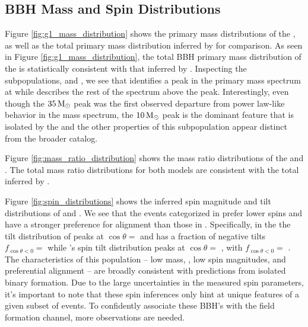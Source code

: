 \subsection{BBH Mass and Spin Distributions}

Figure \ref{fig:g1_mass_distribution} shows the primary mass distributions of the \base{}, as well as the total primary mass distribution inferred by \brucepaper{} for comparison. As seen in Figure \ref{fig:g1_mass_distribution}, the total BBH primary mass distribution of the \base{} is statistically consistent with that inferred by \brucepaper{}. Inspecting the subpopulations, \first{} and \contB{}, we see that \first{} identifies a peak in the primary mass spectrum at \result{$\CIPlusMinus{\macros[Mass][Base][PeakA][max]}$} while \contB{} describes the rest of the spectrum above the peak. Interestingly, even though the $35{\,\rm M}_\odot$ peak was the first observed departure from power law-like behavior in the mass spectrum, the $10{\,\rm M}_\odot$ peak is the dominant feature that is isolated by the \comp{} and the other properties of this subpopulation appear distinct from the broader catalog.

Figure \ref{fig:mass_ratio_distribution} shows the mass ratio distributions of the \base{} and \comp{}.  The total mass ratio distributions for both models are consistent with the total inferred by \brucepaper.

Figure \ref{fig:spin_distributions} shows the inferred spin magnitude and tilt distributions of \popA{} and \popB{}. We see that the events categorized in \popA{} prefer lower spins and have a stronger preference for alignment than those in \popB{}. Specifically, in the \base{} the tilt distribution of \popA{} peaks at $\cos{\theta}=$ \result{$\CIPlusMinus{\macros[CosTilt][Base][PeakA][max]}$} and has a fraction of negative tilts $f_{\cos{\theta} < 0} = $ \result{$\CIPlusMinus{\macros[CosTilt][Base][PeakA][negfrac]}$} while \popB{}'s spin tilt distribution peaks at $\cos{\theta}=$ \result{$\CIPlusMinus{\macros[CosTilt][Base][ContinuumB][max]}$}, with $f_{\cos{\theta} < 0} = $ \result{$\CIPlusMinus{\macros[CosTilt][Base][ContinuumB][negfrac]}$}. The characteristics of this population -- low mass, , low spin magnitudes, and preferential alignment -- are broadly consistent with predictions from isolated binary formation. Due to the large uncertainties in the measured spin parameters, it's important to note that these spin inferences only hint at unique features of a given subset of events. To confidently associate these BBH's with the field formation channel, more observations are needed.

